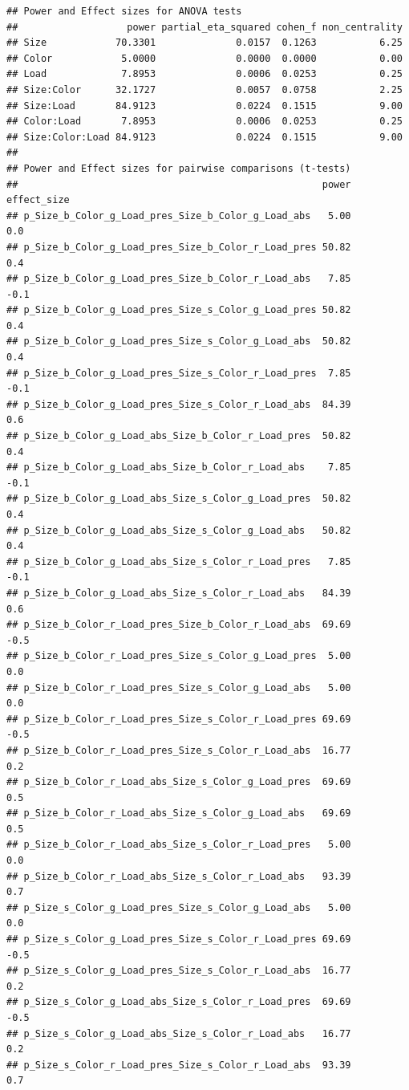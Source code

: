 \documentclass[
]{book}
\begin{document}
\begin{verbatim}
## Power and Effect sizes for ANOVA tests
##                   power partial_eta_squared cohen_f non_centrality
## Size            70.3301              0.0157  0.1263           6.25
## Color            5.0000              0.0000  0.0000           0.00
## Load             7.8953              0.0006  0.0253           0.25
## Size:Color      32.1727              0.0057  0.0758           2.25
## Size:Load       84.9123              0.0224  0.1515           9.00
## Color:Load       7.8953              0.0006  0.0253           0.25
## Size:Color:Load 84.9123              0.0224  0.1515           9.00
## 
## Power and Effect sizes for pairwise comparisons (t-tests)
##                                                     power effect_size
## p_Size_b_Color_g_Load_pres_Size_b_Color_g_Load_abs   5.00         0.0
## p_Size_b_Color_g_Load_pres_Size_b_Color_r_Load_pres 50.82         0.4
## p_Size_b_Color_g_Load_pres_Size_b_Color_r_Load_abs   7.85        -0.1
## p_Size_b_Color_g_Load_pres_Size_s_Color_g_Load_pres 50.82         0.4
## p_Size_b_Color_g_Load_pres_Size_s_Color_g_Load_abs  50.82         0.4
## p_Size_b_Color_g_Load_pres_Size_s_Color_r_Load_pres  7.85        -0.1
## p_Size_b_Color_g_Load_pres_Size_s_Color_r_Load_abs  84.39         0.6
## p_Size_b_Color_g_Load_abs_Size_b_Color_r_Load_pres  50.82         0.4
## p_Size_b_Color_g_Load_abs_Size_b_Color_r_Load_abs    7.85        -0.1
## p_Size_b_Color_g_Load_abs_Size_s_Color_g_Load_pres  50.82         0.4
## p_Size_b_Color_g_Load_abs_Size_s_Color_g_Load_abs   50.82         0.4
## p_Size_b_Color_g_Load_abs_Size_s_Color_r_Load_pres   7.85        -0.1
## p_Size_b_Color_g_Load_abs_Size_s_Color_r_Load_abs   84.39         0.6
## p_Size_b_Color_r_Load_pres_Size_b_Color_r_Load_abs  69.69        -0.5
## p_Size_b_Color_r_Load_pres_Size_s_Color_g_Load_pres  5.00         0.0
## p_Size_b_Color_r_Load_pres_Size_s_Color_g_Load_abs   5.00         0.0
## p_Size_b_Color_r_Load_pres_Size_s_Color_r_Load_pres 69.69        -0.5
## p_Size_b_Color_r_Load_pres_Size_s_Color_r_Load_abs  16.77         0.2
## p_Size_b_Color_r_Load_abs_Size_s_Color_g_Load_pres  69.69         0.5
## p_Size_b_Color_r_Load_abs_Size_s_Color_g_Load_abs   69.69         0.5
## p_Size_b_Color_r_Load_abs_Size_s_Color_r_Load_pres   5.00         0.0
## p_Size_b_Color_r_Load_abs_Size_s_Color_r_Load_abs   93.39         0.7
## p_Size_s_Color_g_Load_pres_Size_s_Color_g_Load_abs   5.00         0.0
## p_Size_s_Color_g_Load_pres_Size_s_Color_r_Load_pres 69.69        -0.5
## p_Size_s_Color_g_Load_pres_Size_s_Color_r_Load_abs  16.77         0.2
## p_Size_s_Color_g_Load_abs_Size_s_Color_r_Load_pres  69.69        -0.5
## p_Size_s_Color_g_Load_abs_Size_s_Color_r_Load_abs   16.77         0.2
## p_Size_s_Color_r_Load_pres_Size_s_Color_r_Load_abs  93.39         0.7
\end{verbatim}
\end{document}
